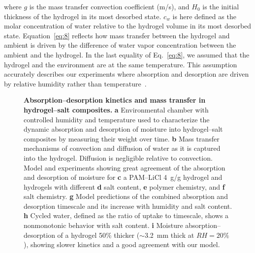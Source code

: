 \documentclass[11pt]{article}
\begin{document}
where $g$ is the mass transfer convection coefficient (m/s), and $H_0$ is the initial thickness of the hydrogel in its most desorbed state. $c_w$ is here defined as the molar concentration of water relative to the hydrogel volume in its most desorbed state. Equation~\ref{eq:8} reflects how mass transfer between the hydrogel and ambient is driven by the difference of water vapor concentration between the ambient and the hydrogel. In the last equality of Eq.~\ref{eq:8}, we assumed that the hydrogel and the environment are at the same temperature. This assumption accurately describes our experiments where absorption and desorption are driven by relative humidity rather than temperature~\cite{diazmarin2024a}.

\begin{figure}[t]
\centering
{}
\caption{\textbf{Absorption--desorption kinetics and mass transfer in hydrogel--salt composites.} \textbf{a} Environmental chamber with controlled humidity and temperature used to characterize the dynamic absorption and desorption of moisture into hydrogel--salt composites by measuring their weight over time. \textbf{b} Mass transfer mechanisms of convection and diffusion of water as it is captured into the hydrogel. Diffusion is negligible relative to convection. Model and experiments showing great agreement of the absorption and desorption of moisture for \textbf{c} a PAM--LiCl 4~g/g hydrogel and hydrogels with different \textbf{d} salt content, \textbf{e} polymer chemistry, and \textbf{f} salt chemistry. \textbf{g} Model predictions of the combined absorption and desorption timescale and its increase with humidity and salt content. \textbf{h} Cycled water, defined as the ratio of uptake to timescale, shows a nonmonotonic behavior with salt content. \textbf{i} Moisture absorption--desorption of a hydrogel 50\% thicker ($\sim$3.2~mm thick at $RH = 20\%$), showing slower kinetics and a good agreement with our model.}
\label{fig:fig5}
\end{figure}
\end{document}

